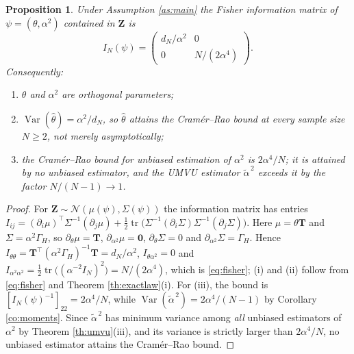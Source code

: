 \documentclass[11pt,reqno]{amsart}
\numberwithin{equation}{section}
\theoremstyle{plain}
\newtheorem{proposition}[theorem]{Proposition}
\theoremstyle{definition}
\theoremstyle{remark}
\newcommand{\bT}{\mathbf{T}}
\newcommand{\bZ}{\mathbf{Z}}
\newcommand{\bze}{\mathbf{0}}
\newcommand{\GH}{\Gamma_H}
\newcommand{\Norm}{\mathcal{N}}
\DeclareMathOperator{\Var}{Var}
\DeclareMathOperator{\tr}{tr}
\begin{document}
\begin{proposition}\label{pr:fisher}
Under Assumption \ref{as:main} the Fisher information matrix of
$\psi=(\theta,\alpha^{2})$ contained in $\bZ$ is
\begin{equation}\label{eq:fisher}
  I_N(\psi)=\begin{pmatrix} d_N/\alpha^{2} & 0\\[2pt] 0 & N/(2\alpha^{4})\end{pmatrix}.
\end{equation}
Consequently:
\begin{enumerate}[label=\textup{(\roman*)}]
\item $\theta$ and $\alpha^{2}$ are orthogonal parameters;
\item $\Var(\widehat\theta)=\alpha^{2}/d_N$, so $\widehat\theta$ attains the
      Cram\'er--Rao bound at every sample size $N\ge2$, not merely asymptotically;
\item the Cram\'er--Rao bound for unbiased estimation of $\alpha^{2}$ is
      $2\alpha^{4}/N$; it is attained by no unbiased estimator, and the UMVU estimator
      $\widetilde\alpha^{\,2}$ exceeds it by the factor $N/(N-1)\to1$.
\end{enumerate}
\end{proposition}

\begin{proof}
For $\bZ\sim\Norm(\mu(\psi),\Sigma(\psi))$ the information matrix has entries
$I_{ij}=(\partial_i\mu)^{\top}\Sigma^{-1}(\partial_j\mu)
+\tfrac12\tr\bigl(\Sigma^{-1}(\partial_i\Sigma)\Sigma^{-1}(\partial_j\Sigma)\bigr)$.
Here $\mu=\theta\bT$ and $\Sigma=\alpha^{2}\GH$, so $\partial_\theta\mu=\bT$,
$\partial_{\alpha^{2}}\mu=\bze$, $\partial_\theta\Sigma=0$ and
$\partial_{\alpha^{2}}\Sigma=\GH$. Hence
$I_{\theta\theta}=\bT^{\top}(\alpha^{2}\GH)^{-1}\bT=d_N/\alpha^{2}$,
$I_{\theta\alpha^{2}}=0$ and
$I_{\alpha^{2}\alpha^{2}}=\tfrac12\tr\bigl((\alpha^{-2}I_N)^{2}\bigr)=N/(2\alpha^{4})$,
which is \eqref{eq:fisher}; (i) and (ii) follow from \eqref{eq:fisher} and Theorem
\ref{th:exactlaw}(i). For (iii), the bound is $[I_N(\psi)^{-1}]_{22}=2\alpha^{4}/N$,
while $\Var(\widetilde\alpha^{\,2})=2\alpha^{4}/(N-1)$ by Corollary \ref{co:moments}.
Since $\widetilde\alpha^{\,2}$ has minimum variance among \emph{all} unbiased estimators
of $\alpha^{2}$ by Theorem \ref{th:umvu}(iii), and its variance is strictly larger than
$2\alpha^{4}/N$, no unbiased estimator attains the Cram\'er--Rao bound.
\end{proof}
\end{document}
